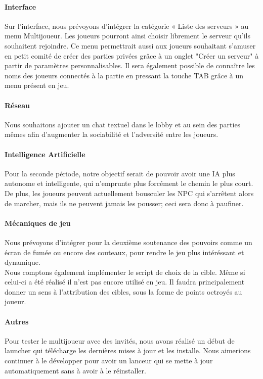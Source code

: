         \paragraph{Interface}
        Sur l’interface, nous prévoyons d’intégrer la catégorie « Liste des serveurs » au menu Multijoueur. 
        Les joueurs pourront ainsi choisir librement le serveur qu’ils souhaitent rejoindre. 
        Ce menu permettrait aussi aux joueurs souhaitant s'amuser en petit comité de créer des 
        parties privées grâce à un onglet "Créer un serveur" à partir de paramètres personnalisables. 
        Il sera également possible de connaître les noms des joueurs connectés à la partie en pressant 
        la touche TAB grâce à un menu présent en jeu.

        \paragraph{Réseau}
        Nous souhaitons ajouter un chat textuel dans le lobby et au sein des parties mêmes afin d’augmenter la sociabilité et l’adversité entre les joueurs.

        \paragraph{Intelligence Artificielle}
        Pour la seconde période, notre objectif serait de pouvoir avoir une IA plus autonome et intelligente, qui n'emprunte plus forcément le chemin le plus court. 
        De plus, les joueurs peuvent actuellement bousculer les NPC qui s'arrêtent alors de marcher, mais ils ne peuvent jamais les pousser; 
        ceci sera donc à paufiner.

        \paragraph{Mécaniques de jeu}
        Nous prévoyons d'intégrer pour la deuxième soutenance des pouvoirs
        comme un écran de fumée ou encore des couteaux,
        pour rendre le jeu plus intéréssant et dynamique.\\
        Nous comptons également implémenter le script de choix de la cible.
        Même si celui-ci a été réalisé il n'est pas encore utilisé en jeu.
        Il faudra principalement donner un sens à l'attribution des cibles,
        sous la forme de points octroyés au joueur.

        \paragraph{Autres}
        Pour tester le multijoueur avec des invités, nous avons réalisé 
        un début de launcher qui télécharge les dernières mises à jour et les installe.
        Nous aimerions continuer à le développer pour avoir un lanceur
        qui se mette à jour automatiquement sans à avoir à le réinstaller.


